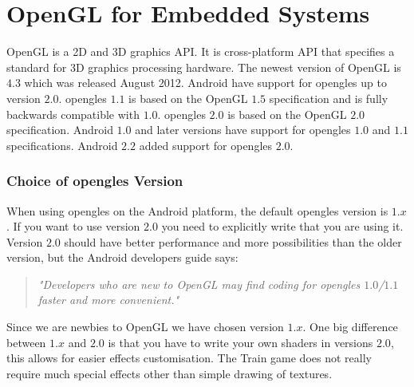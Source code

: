 \chapter{OpenGL for Embedded Systems}
OpenGL is a 2D and 3D graphics API. It is cross-platform API that specifies a standard for 3D graphics processing hardware. The newest version of OpenGL is $4.3$ which was released August 2012. Android have support for \ac{opengles} up to version $2.0$. \ac{opengles} $1.1$ is based on the OpenGL $1.5$ specification and is fully backwards compatible with $1.0$. \ac{opengles} $2.0$ is based on the OpenGL $2.0$ specification. Android $1.0$ and later versions have support for \ac{opengles} $1.0$ and $1.1$ specifications. Android $2.2$ added support for \ac{opengles} $2.0$. \citep{androidopengl, khronosopengl, khronosopengles}

\subsection*{Choice of \ac{opengles} Version}
When using \ac{opengles} on the Android platform, the default \ac{opengles} version is $1.x$. If you want to use version $2.0$ you need to explicitly write that you are using it. Version $2.0$ should have better performance and more possibilities than the older version, but the Android developers guide says:
\begin{quote}
\textit{"Developers who are new to OpenGL may find coding for \ac{opengles} $1.0$/$1.1$ faster and more convenient."} \citep{androidopengl}
\end{quote}
Since we are newbies to OpenGL we have chosen version $1.x$. One big difference between $1.x$ and $2.0$ is that you have to write your own shaders in versions $2.0$, this allows for easier effects customisation. The Train game does not really require much special effects other than simple drawing of textures.

